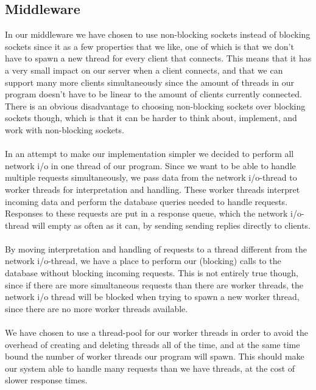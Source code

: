 \documentclass{article}
\begin{document}
        \subsection{Middleware}
            \label{sec:description_middleware}
            In our middleware we have chosen to use non-blocking sockets instead of blocking sockets since it as a few properties that we like, one of which is that we don't have to spawn a new thread for every client that connects. This means that it has a very small impact on our server when a client connects, and that we can support many more clients simultaneously since the amount of threads in our program doesn't have to be linear to the amount of clients currently connected. There is an obvious disadvantage to choosing non-blocking sockets over blocking sockets though, which is that it can be harder to think about, implement, and work with non-blocking sockets.\\
            \\
            In an attempt to make our implementation simpler we decided to perform all network i/o in one thread of our program. Since we want to be able to handle multiple requests simultaneously, we pass data from the network i/o-thread to worker threads for interpretation and handling. These worker threads interpret incoming data and perform the database queries needed to handle requests. Responses to these requests are put in a response queue, which the network i/o-thread will empty as often as it can, by sending sending replies directly to clients.\\
            \\
            By moving interpretation and handling of requests to a thread different from the network i/o-thread, we have a place to perform our (blocking) calls to the database without blocking incoming requests. This is not entirely true though, since if there are more simultaneous requests than there are worker threads, the network i/o thread will be blocked when trying to spawn a new worker thread, since there are no more worker threads available.\\
            \\
            We have chosen to use a thread-pool for our worker threads in order to avoid the overhead of creating and deleting threads all of the time, and at the same time bound the  number of worker threads our program will spawn. This should make our system able to handle many requests than we have threads, at the cost of slower response times.\\
\end{document}
